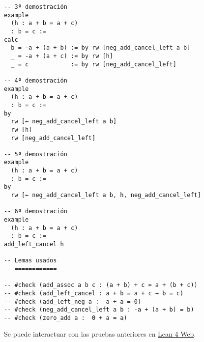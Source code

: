 \begin{verbatim}
-- 3ª demostración
example
  (h : a + b = a + c)
  : b = c :=
calc
  b = -a + (a + b) := by rw [neg_add_cancel_left a b]
  _ = -a + (a + c) := by rw [h]
  _ = c            := by rw [neg_add_cancel_left]

-- 4ª demostración
example
  (h : a + b = a + c)
  : b = c :=
by
  rw [← neg_add_cancel_left a b]
  rw [h]
  rw [neg_add_cancel_left]

-- 5ª demostración
example
  (h : a + b = a + c)
  : b = c :=
by
  rw [← neg_add_cancel_left a b, h, neg_add_cancel_left]

-- 6ª demostración
example
  (h : a + b = a + c)
  : b = c :=
add_left_cancel h

-- Lemas usados
-- ============

-- #check (add_assoc a b c : (a + b) + c = a + (b + c))
-- #check (add_left_cancel : a + b = a + c → b = c)
-- #check (add_left_neg a : -a + a = 0)
-- #check (neg_add_cancel_left a b : -a + (a + b) = b)
-- #check (zero_add a :  0 + a = a)
\end{verbatim}
Se puede interactuar con las pruebas anteriores en \href{https://lean.math.hhu.de/\#url=https://raw.githubusercontent.com/jaalonso/Calculemus2/main/src/Cancelativa\_izquierda.lean}{Lean 4 Web}.

